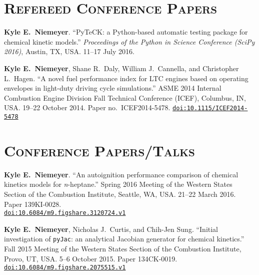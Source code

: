 \documentclass[margin,line,11pt]{res}
\makeatletter
\newlength{\bibhang}
\newlength{\bibsep}
 {\@listi \global\bibsep\itemsep \global\advance\bibsep by\parsep}
\newenvironment{bibenum*}
  {\renewcommand\labelenumi{\theenumi.}%
   \etaremune[
     topsep=0pt,
     itemsep=\bibsep,
     parsep=0pt,partopsep=0pt,
     itemindent=-\bibhang,
     leftmargin={\bibhang+\widthof{[999]}}]}
  {\endetaremune}
\newcommand*{\doi}[1]{\href{http://dx.doi.org/#1}{\nolinkurl{doi:#1}}}
\makeatother
\begin{document}
\begin{resume}
\begin{bibenum*}
\end{bibenum*}

\section{\textsc{Refereed Conference Papers}}

\begin{bibenum*}

\item \textbf{Kyle E.\ Niemeyer}.
``PyTeCK: a Python-based automatic testing package for chemical kinetic models.''
\emph{Proceedings of the  Python in Science Conference (SciPy 2016)},
Austin, TX, USA.
11--17 July 2016.

\item \textbf{Kyle E.\ Niemeyer}, Shane R.\ Daly, William J.\ Cannella, and Christopher L.\ Hagen.
``A novel fuel performance index for LTC engines based on operating envelopes in light-duty driving cycle simulations.''
ASME 2014 Internal Combustion Engine Division Fall Technical Conference (ICEF), Columbus, IN, USA.
19--22 October 2014.
Paper no.~ICEF2014-5478.
\doi{10.1115/ICEF2014-5478}

\end{bibenum*}

\section{\textsc{Conference Papers\slash Talks}}

\begin{bibenum*}

\item \textbf{Kyle E.\ Niemeyer}. ``An autoignition performance comparison of chemical kinetics models for \emph{n}-heptane.''
Spring 2016 Meeting of the Western States Section of the Combustion Institute, Seattle, WA, USA.
21--22 March 2016.
Paper 139KI-0028. \\
\doi{10.6084/m9.figshare.3120724.v1}

\item \textbf{Kyle E.\ Niemeyer}, Nicholas J.\ Curtis, and Chih-Jen Sung. ``Initial investigation of \texttt{pyJac}: an analytical Jacobian generator for chemical kinetics.''
Fall 2015 Meeting of the Western States Section of the Combustion Institute, Provo, UT, USA.
5--6 October 2015.
Paper 134CK-0019.
\doi{10.6084/m9.figshare.2075515.v1}


\end{bibenum*}
\end{resume}
\end{document}
